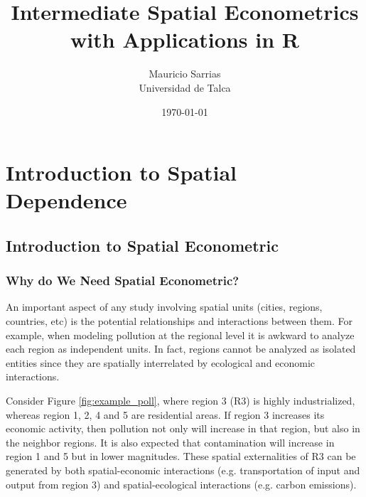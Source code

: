 \documentclass[english,12pt]{book}\usepackage[]{graphicx}\usepackage[]{xcolor}
\begin{document}
\frontmatter
\title{Intermediate Spatial Econometrics with Applications in R}
\author{Mauricio Sarrias\\
Universidad de Talca}
\date{\today}
\maketitle
\tableofcontents

\listoffigures
\listoftables



\mainmatter

\part{Introduction to Spatial Dependence}


\chapter{Introduction to Spatial Econometric}\label{chapater:Introduction}


\section{Why do We Need Spatial Econometric?}\label{sec:why_se}

An important aspect of any study involving spatial units (cities, regions, countries, etc) is the potential relationships and interactions between them. For example, when modeling pollution at the regional level it is awkward to analyze each region as independent units.  In fact, regions cannot be analyzed as isolated entities since they are spatially interrelated by ecological and economic interactions. 

Consider Figure \ref{fig:example_poll}, where region 3 (R3) is highly industrialized, whereas region 1, 2, 4 and 5 are residential areas. If region 3 increases its economic activity, then pollution not only will increase in that region, but also in the neighbor regions. It is also expected that contamination will increase in region 1 and 5 but in lower magnitudes. These spatial externalities of R3 can be generated by both spatial-economic interactions (e.g. transportation of input and output from region 3) and spatial-ecological interactions (e.g. carbon emissions). 
\end{document}
